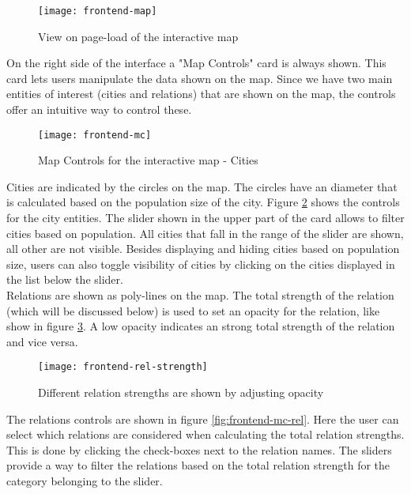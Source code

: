 \begin{figure}[H]
\centering
\texttt{[image: frontend-map]}
\caption{View on page-load of the interactive map}
\label{fig:frontend-map}
\end{figure}

On the right side of the interface a "Map Controls" card is always shown. This card lets users manipulate the data shown on the map. Since we have two main entities of interest (cities and relations) that are shown on the map, the controls offer an intuitive way to control these.\\

\begin{figure}[H]
\centering
\texttt{[image: frontend-mc]}
\caption{Map Controls for the interactive map - Cities}
\label{fig:frontend-mc}
\end{figure}

Cities are indicated by the circles on the map. The circles have an diameter that is calculated based on the population size of the city. Figure \ref{fig:frontend-mc} shows the controls for the city entities. The slider shown in the upper part of the card allows to filter cities based on population. All cities that fall in the range of the slider are shown, all other are not visible. Besides displaying and hiding cities based on population size, users can also toggle visibility of cities by clicking on the cities displayed in the list below the slider.\\
Relations are shown as poly-lines on the map. The total strength of the relation (which will be discussed below) is used to set an opacity for the relation, like show in figure \ref{fig:frontend-rel-strength}. A low opacity indicates an strong total strength of the relation and vice versa.

\begin{figure}[H]
\centering
\texttt{[image: frontend-rel-strength]}
\caption{Different relation strengths are shown by adjusting opacity}
\label{fig:frontend-rel-strength}
\end{figure}

The relations controls are shown in figure \ref{fig:frontend-mc-rel}. Here the user can select which relations are considered when calculating the total relation strengths. This is done by clicking the check-boxes next to the relation names. The sliders provide a way to filter the relations based on the total relation strength for the category belonging to the slider.\\

